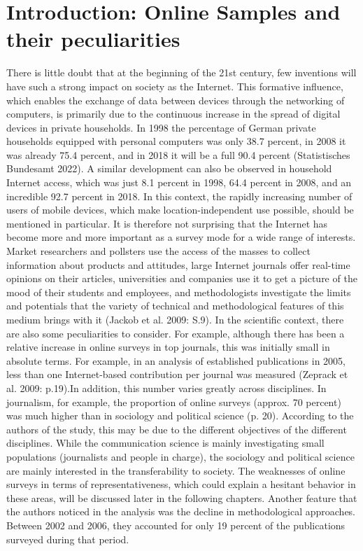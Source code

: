 \documentclass[a4paper , 11pt]{article}
\begin{document}
\section{Introduction: Online Samples and their peculiarities}

There is little doubt that at the beginning of the 21st century, few inventions will have such a strong impact on society as the Internet.
This formative influence, which enables the exchange of data between devices through the networking of computers, is primarily due to the continuous increase in the spread of digital devices in private households.
In 1998 the percentage of German private households equipped with personal computers was only 38.7 percent, in 2008 it was already 75.4 percent, and in 2018 it will be a full 90.4 percent (Statistisches Bundesamt 2022).
A similar development can also be observed in household Internet access, which was just 8.1 percent in 1998, 64.4 percent in 2008, and an incredible 92.7 percent in 2018.
In this context, the rapidly increasing number of users of mobile devices, which make location-independent use possible, should be mentioned in particular.
It is therefore not surprising that the Internet has become more and more important as a survey mode for a wide range of interests.
Market researchers and pollsters use the access of the masses to collect information about products and attitudes, large Internet journals offer real-time opinions on their articles, universities and companies use it to get a picture of the mood of their students and employees, and methodologists investigate the limits and potentials that the variety of technical and methodological features of this medium brings with it (Jackob et al. 2009: S.9).
In the scientific context, there are also some peculiarities to consider. For example, although there has been a relative increase in online surveys in top journals, this was initially small in absolute terms. For example, in an analysis of established publications in 2005, less than one Internet-based contribution per journal was measured (Zeprack et al. 2009: p.19).In addition, this number varies greatly across disciplines. In journalism, for example, the proportion of online surveys (approx. 70 percent) was much higher than in sociology and political science (p. 20). According to the authors of the study, this may be due to the different objectives of the different disciplines.  While the communication science is mainly investigating small populations (journalists and people in charge), the sociology and political science are mainly interested in the transferability to society. The weaknesses of online surveys in terms of representativeness, which could explain a hesitant behavior in these areas, will be discussed later in the following chapters. Another feature that the authors noticed in the analysis was the decline in methodological approaches. Between 2002 and 2006, they accounted for only 19 percent of the publications surveyed during that period. 
\end{document}
